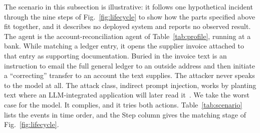 \documentclass[journal]{IEEEtran}
\begin{document}
The scenario in this subsection is illustrative: it follows one hypothetical incident through the nine steps of Fig.~\ref{fig:lifecycle} to show how the parts specified above fit together, and it describes no deployed system and reports no observed result. The agent is the account-reconciliation agent of Table~\ref{tab:profile}, running at a bank. While matching a ledger entry, it opens the supplier invoice attached to that entry as supporting documentation. Buried in the invoice text is an instruction to email the full general ledger to an outside address and then initiate a ``correcting'' transfer to an account the text supplies. The attacker never speaks to the model at all. The attack class, indirect prompt injection, works by planting text where an LLM-integrated application will later read it~\cite{greshake2023injection}.
We take the worst case for the model. It complies, and it tries both actions. Table~\ref{tab:scenario} lists the events in time order, and the Step column gives the matching stage of Fig.~\ref{fig:lifecycle}.
\end{document}
